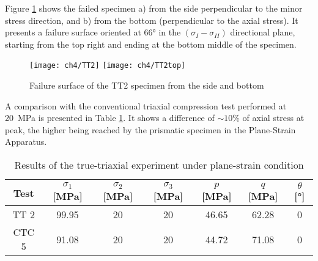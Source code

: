 Figure \ref{fig4:14} shows the failed specimen a) from the side perpendicular to the minor stress direction, and b) from the bottom (perpendicular to the axial stress). It presents a failure surface oriented at \ang{66} in the $(\sigma_I-\sigma_{II})$ directional plane, starting from the top right and ending at the bottom middle of the specimen. 


\begin{figure}[!]
    \centering
    \texttt{[image: ch4/TT2]}
    \texttt{[image: ch4/TT2top]}
    \captionsetup{justification=centering}
    \caption{Failure surface of the TT2 specimen from the side and bottom}
    \label{fig4:14}
\end{figure} 





A comparison with the conventional triaxial compression test performed at \SI{20}{MPa} is presented in Table \ref{tb4:TT2_CTC5}. It shows a difference of $\sim 10\%$ of axial stress at peak, the higher being reached by the prismatic specimen in the Plane-Strain Apparatus.

\begin{table}
    \centering
    \captionsetup{justification=centering}
    \caption{Results of the true-triaxial experiment under plane-strain condition}
    \begin{tabular}{ccccccc}
        \hline
        Test & $\sigma_1$ [\si{MPa}] & $\sigma_2$ [\si{MPa}] & $\sigma_3$ [\si{MPa}] & $p$ [\si{MPa}] & $q$ [\si{MPa}] & $\theta$ [\si{\degree}] \\
        \hline
        \hline
        TT 2 & 99.95 & 20 & 20 & 46.65 & 62.28 & 0\\
        CTC 5 & 91.08 & 20 & 20 & 44.72 & 71.08 & 0 \\
        \hline
    \end{tabular}
    \label{tb4:TT2_CTC5}
\end{table}


